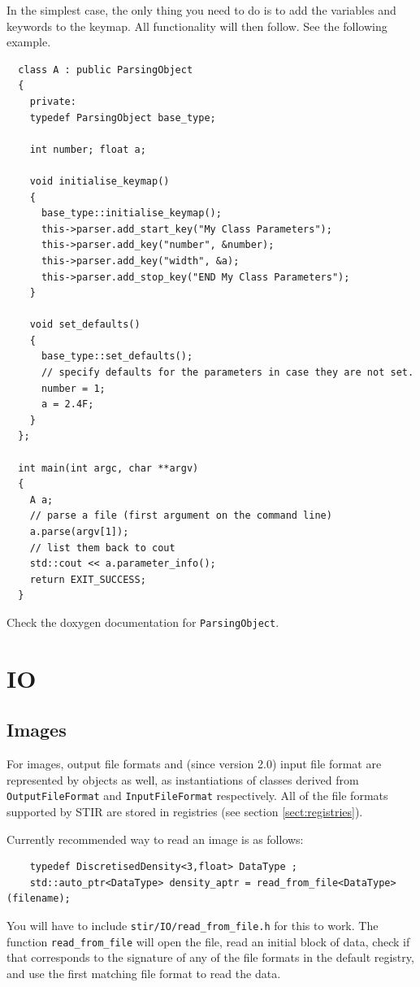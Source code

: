\documentclass{article}
\begin{document}
In the simplest case, the only thing you need to do is to add the variables
and keywords to the keymap. All functionality will then follow. See the
following example.

\begin{verbatim}
  class A : public ParsingObject
  {
    private:
    typedef ParsingObject base_type;

    int number; float a;

    void initialise_keymap()
    {
      base_type::initialise_keymap();
      this->parser.add_start_key("My Class Parameters");
      this->parser.add_key("number", &number);
      this->parser.add_key("width", &a);
      this->parser.add_stop_key("END My Class Parameters");
    }

    void set_defaults()
    {
      base_type::set_defaults();
      // specify defaults for the parameters in case they are not set.
      number = 1;
      a = 2.4F;
    }
  };

  int main(int argc, char **argv)
  {
    A a;
    // parse a file (first argument on the command line)
    a.parse(argv[1]);
    // list them back to cout
    std::cout << a.parameter_info();
    return EXIT_SUCCESS;
  }
\end{verbatim}

Check the doxygen documentation for
\texttt{ParsingObject}.

\section{
IO \label{sect:IO}}

\subsection{Images}
For images, output file formats and (since version 2.0) input file format are represented 
by objects as well, as instantiations of classes derived from 
\texttt{OutputFileFormat} and \texttt{InputFileFormat} respectively. All of
the file formats supported by STIR are stored in registries (see section \ref{sect:registries}).

Currently recommended way to read an image is as follows:
\begin{verbatim}
    typedef DiscretisedDensity<3,float> DataType ;
    std::auto_ptr<DataType> density_aptr = read_from_file<DataType>(filename);
\end{verbatim}
You will have to include \texttt{stir/IO/read\_from\_file.h} for this to work. The function
\texttt{read\_from\_file} will open the file, read an initial block of data, check
if that corresponds to the signature of any of the file formats in the
default registry, and use the first matching file format to read the data.
\end{document}
